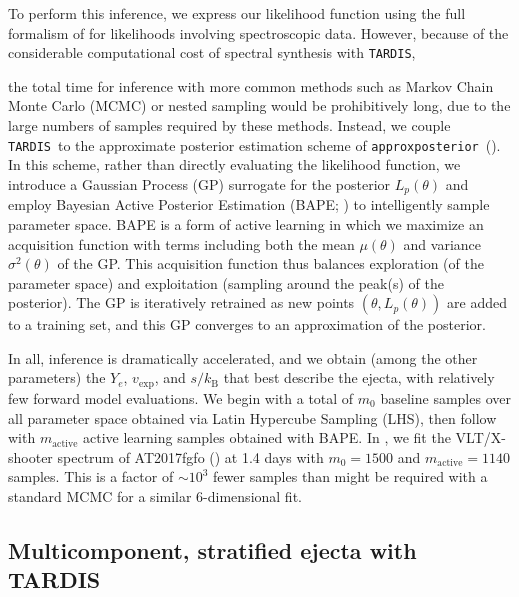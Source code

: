 \documentclass[twocolumn,twocolappendix]{aastex63}
\def\TARDIS{\texttt{TARDIS}}
\def\approxposterior{\texttt{approxposterior}}
\def\V23{\citetalias{vieira23}}
\begin{document}
To perform this inference, we express our likelihood function using the full formalism of \cite{czekala15} for likelihoods involving spectroscopic data. However, because of the considerable computational cost of spectral synthesis with \TARDIS, {the total time for inference with more common methods such as Markov Chain Monte Carlo (MCMC) or nested sampling would be prohibitively long, due to the large numbers of samples required by these methods. Instead, we couple \TARDIS~to the approximate posterior estimation scheme of \approxposterior~(\citealt{fleming18,fleming20}). In this scheme, rather than directly evaluating the likelihood function, we introduce a Gaussian Process (GP) surrogate for the posterior $L_p (\theta)$ and employ Bayesian Active Posterior Estimation (BAPE; \citealt{kandasamy17}) to intelligently sample parameter space. BAPE is a form of active learning in which we maximize an acquisition function with terms including both the mean $\mu(\theta)$ and variance $\sigma^2(\theta)$ of the GP. This acquisition function thus balances exploration (of the parameter space) and exploitation (sampling around the peak(s) of the posterior). The GP is iteratively retrained as new points $(\theta, L_p(\theta))$ are added to a training set, and this GP converges to an approximation of the posterior. 

In all, inference is dramatically accelerated, and we obtain (among the other parameters) the $Y_e$, $v_{\mathrm{exp}}$, and $s / k_{\mathrm{B}}$ that best describe the ejecta, with relatively few forward model evaluations. We begin with a total of $m_0$ baseline samples over all parameter space obtained via Latin Hypercube Sampling (LHS), then follow with $m_{\mathrm{active}}$ active learning samples obtained with BAPE. In \V23, we fit the VLT/X-shooter spectrum of AT2017fgfo (\citealt{pian17, smartt17}) at 1.4 days with $m_0 = 1500$ and $m_{\mathrm{active}} = 1140$ samples. This is a factor of $\sim 10^3$ fewer samples than might be required with a standard MCMC for a similar 6-dimensional fit. 




\subsection{Multicomponent, stratified ejecta with \textsc{TARDIS}}\label{ssc:multicomponent-TARDIS}

}
\end{document}
